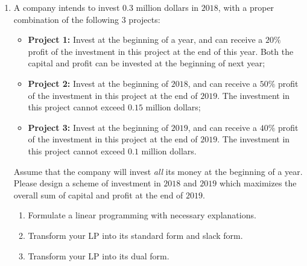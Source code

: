 \documentclass[12pt,a4paper]{article}
\theoremstyle{definition}
\begin{document}
\begin{enumerate}
    \item
    A company intends to invest $0.3$ million dollars in $2018$, with a proper combination of the following $3$ projects:
    \begin{itemize}
    \item \textbf{Project 1:} Invest at the beginning of a year, and can receive a $20\%$ profit of the investment in this project at the end of this year. Both the capital and profit can be invested at the beginning of next year;
    \item \textbf{Project 2:} Invest at the beginning of $2018$, and can receive a $50\%$ profit of the investment in this project at the end of $2019$. The investment in this project cannot exceed $0.15$ million dollars;
    \item \textbf{Project 3:} Invest at the beginning of $2019$, and can receive a $40\%$ profit of the investment in this project at the end of $2019$. The investment in this project cannot exceed $0.1$ million dollars.
    \end{itemize}
    Assume that the company will invest \emph{all} its money at the beginning of a year. Please design a scheme of investment in $2018$ and $2019$ which maximizes the overall sum of capital and profit at the end of $2019$.
    \begin{enumerate}
    \item
    Formulate a linear programming with necessary explanations.

    \item
    Transform your LP into its standard form and slack form.

    \item
    Transform your LP into its dual form.


\end{enumerate}
\end{enumerate}
\end{document}
